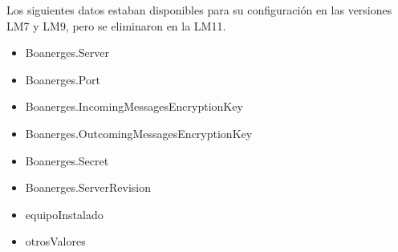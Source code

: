 Los siguientes datos estaban disponibles para su configuración en las versiones LM7 y LM9, pero se eliminaron en la LM11.
\begin{itemize}
	\item Boanerges.Server
	\item Boanerges.Port
	\item Boanerges.IncomingMessagesEncryptionKey
	\item Boanerges.OutcomingMessagesEncryptionKey
	\item Boanerges.Secret
	\item Boanerges.ServerRevision
	\item equipoInstalado
	\item otrosValores
\end{itemize}
